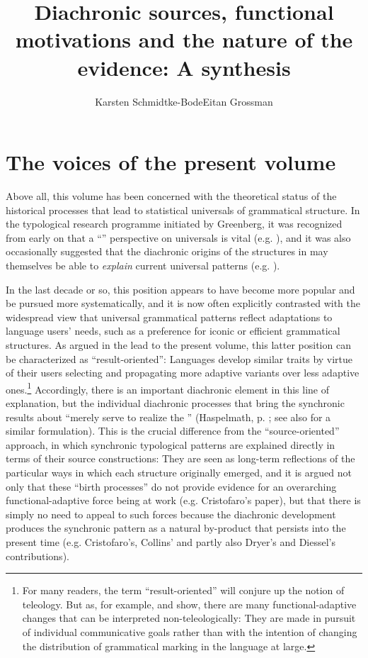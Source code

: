 \documentclass[output=paper]{langsci/langscibook}
\author{Karsten Schmidtke-Bode\affiliation{Leipzig University and Friedrich Schiller University Jena}\lastand Eitan Grossman\affiliation{Hebrew University of Jerusalem}}
\title{Diachronic sources, functional motivations and the nature of the evidence: A synthesis}
\begin{document}
\maketitle 
 
 

\section{The voices of the present volume}\label{sec:epilogue:1}
\largerpage[-1]
Above all, this volume has been concerned with the theoretical status of the historical processes that lead to statistical universals of grammatical structure. In the typological research programme initiated by Greenberg, it was recognized from early on that a “” perspective on universals is vital (e.g. \citealt{Greenberg1969}), and it was also occasionally suggested that the diachronic origins of the structures in  may themselves be able to \textit{explain} current universal patterns (e.g. \citealt{Givón1975,Greenberg1978_Diachr}). 

In the last decade or so, this position appears to have become more popular and be pursued more systematically, and it is now often explicitly contrasted with the widespread view that universal grammatical patterns reflect adaptations to language users’ needs, such as a preference for iconic or efficient grammatical structures. As argued in the lead  to the present volume, this latter position can be characterized as “result-oriented”: Languages develop similar traits by virtue of their users selecting and propagating more adaptive variants over less adaptive ones.\footnote{For many readers, the term “result-oriented” will conjure up the notion of teleology. But as, for example, \citet{Keller1994} and \citet[64--71]{Croft2000_Change} show, there are many functional-adaptive changes that can be interpreted non-teleologically: They are made in pursuit of individual communicative goals rather than with the intention of changing the distribution of grammatical marking in the language at large.} Accordingly, there is an important diachronic element in this line of explanation, but the individual diachronic processes that bring the synchronic results about “merely serve to realize the ” (Haspelmath, p. \pageref{p:haspelmath:merelyserve}; see also \citet[266]{Hawkins2004} for a similar formulation). This is the crucial difference from the “source-oriented” approach, in which synchronic typological patterns are explained directly in terms of their source constructions: They are seen as long-term reflections of the particular ways in which each structure originally emerged, and it is argued not only that these “birth processes” do not provide evidence for an overarching functional-adaptive force being at work (e.g. Cristofaro’s paper), but that there is simply no need to appeal to such forces because the diachronic development produces the synchronic pattern as a natural by-product that persists into the present time (e.g. Cristofaro’s, Collins’ and partly also Dryer’s and Diessel’s contributions). 
\end{document}
